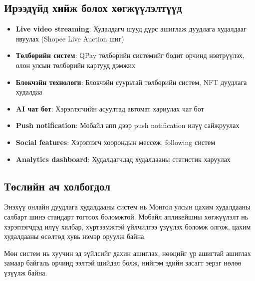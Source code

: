 \subsection{Ирээдүйд хийж болох хөгжүүлэлтүүд}
\begin{itemize}
    \item \textbf{Live video streaming}: Худалдагч шууд дүрс ашиглаж дуудлага худалдааг явуулах (Shopee Live Auction шиг)
    \item \textbf{Төлбөрийн систем}: QPay төлбөрийн системийг бодит орчинд нэвтрүүлэх, олон улсын төлбөрийн картууд дэмжих
    \item \textbf{Блокчэйн технологи}: Блокчэйн суурьтай төлбөрийн систем, NFT дуудлага худалдаа
    \item \textbf{AI чат бот}: Хэрэглэгчийн асуултад автомат хариулах чат бот
    \item \textbf{Push notification}: Мобайл апп дээр push notification илүү сайжруулах
    \item \textbf{Social features}: Хэрэглэгч хоорондын мессеж, following систем
    \item \textbf{Analytics dashboard}: Худалдагчдад худалдааны статистик харуулах
\end{itemize}

\subsection{Төслийн ач холбогдол}
Энэхүү онлайн дуудлага худалдааны систем нь Монгол улсын цахим худалдааны салбарт шинэ стандарт тогтоох боломжтой. Мобайл апликейшны хөгжүүлэлт нь хэрэглэгчдэд илүү хялбар, хүртээмжтэй үйлчилгээ үзүүлэх боломж олгож, цахим худалдааны өсөлтөд хувь нэмэр оруулж байна.

Мөн систем нь хуучин эд зүйлсийг дахин ашиглах, нөөцийг үр ашигтай ашиглах замаар байгаль орчинд ээлтэй шийдэл болж, нийгэм эдийн засагт эерэг нөлөө үзүүлж байна.